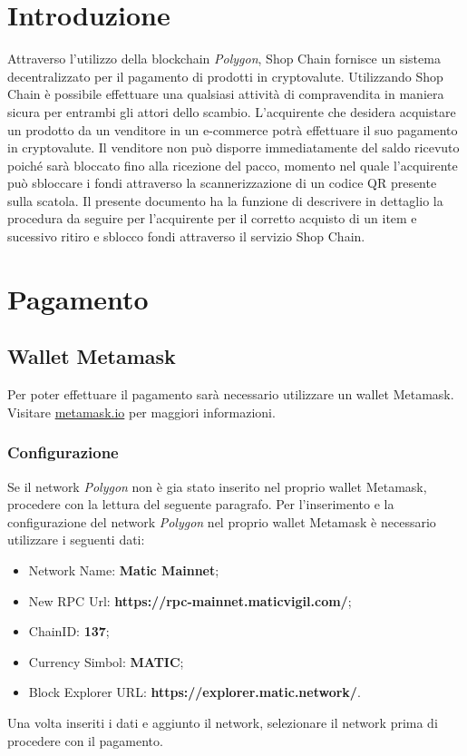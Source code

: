 \documentclass[a4paper, 12pt]{article}
\begin{document}
\makefrontpage
\tableofcontents
\newpage

\section{Introduzione}
Attraverso l'utilizzo della blockchain \textit{Polygon}, Shop Chain fornisce un sistema decentralizzato per il pagamento di prodotti in cryptovalute. Utilizzando Shop Chain è possibile effettuare una qualsiasi attività di compravendita in maniera sicura per entrambi gli attori dello scambio. L'acquirente che desidera acquistare un prodotto da un venditore in un e-commerce potrà effettuare il suo pagamento in cryptovalute. Il venditore non può disporre immediatamente del saldo ricevuto poiché sarà bloccato fino alla ricezione del pacco, momento nel quale l'acquirente può sbloccare i fondi attraverso la scannerizzazione di un codice QR presente sulla scatola.
Il presente documento ha la funzione di descrivere in dettaglio la procedura da seguire per l'acquirente per il corretto acquisto di un item e sucessivo ritiro e sblocco fondi attraverso il servizio Shop Chain.


\section{Pagamento}
\subsection{Wallet Metamask}
Per poter effettuare il pagamento sarà necessario utilizzare un wallet Metamask. Visitare \href{https://www.metamask.io}{metamask.io} per maggiori informazioni.
\subsubsection{Configurazione}
Se il network \textit{Polygon} non è gia stato inserito nel proprio wallet Metamask, procedere con la lettura del seguente paragrafo.
Per l'inserimento e la configurazione del network \textit{Polygon} nel proprio wallet Metamask è necessario utilizzare i seguenti dati:
\begin{itemize}
\item Network Name: \textbf{Matic Mainnet};
\item New RPC Url: \textbf{https://rpc-mainnet.maticvigil.com/};
\item ChainID: \textbf{137};
\item Currency Simbol: \textbf{MATIC};
\item Block Explorer URL: \textbf{https://explorer.matic.network/}.
\end{itemize}
Una volta inseriti i dati e aggiunto il network, selezionare il network prima di procedere con il pagamento.
\end{document}

